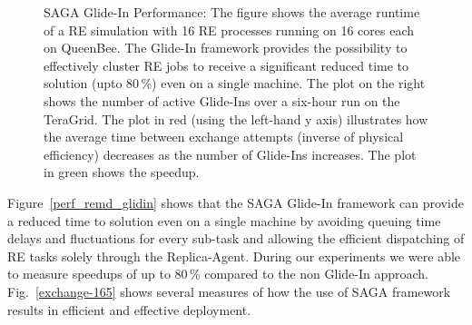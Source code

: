\documentclass{llncs}
\begin{document}
\begin{figure}[htbp]
  \caption{SAGA Glide-In Performance: The figure shows the average
    runtime of a RE simulation with 16 RE processes running on 16
    cores each on QueenBee.  The Glide-In framework provides the
    possibility to effectively cluster RE jobs to receive a
    significant reduced time to solution (upto
    80\,\%) even on a single machine.
    The plot on the right shows the number of active Glide-Ins over a
    six-hour run on the TeraGrid.  The plot in red (using the
    left-hand y axis) illustrates how the average time between
    exchange attempts (inverse of physical efficiency) decreases as
    the number of Glide-Ins increases. The plot in green shows the
    speedup.}
\end{figure}

Figure~\ref{perf_remd_glidin} shows that the SAGA Glide-In framework
can provide a reduced time to solution even on a single machine by
avoiding queuing time delays and fluctuations for every sub-task and
allowing the efficient dispatching of RE tasks solely through the
Replica-Agent. During our experiments we were able to measure speedups
of up to 80\,\% compared to the non Glide-In
approach. Fig.~\ref{exchange-165} shows several measures of how the
use of SAGA framework results in efficient and effective deployment.
\end{document}

